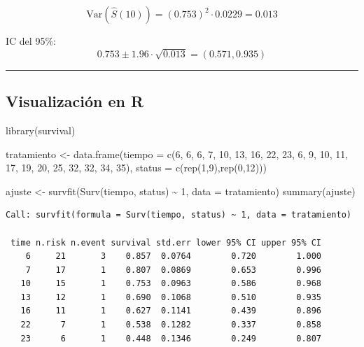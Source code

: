 \documentclass[
]{article}
\newenvironment{Shaded}{\begin{snugshade}}{\end{snugshade}}
\newcommand{\AttributeTok}[1]{\textcolor[rgb]{0.40,0.45,0.13}{#1}}
\newcommand{\DecValTok}[1]{\textcolor[rgb]{0.68,0.00,0.00}{#1}}
\newcommand{\FunctionTok}[1]{\textcolor[rgb]{0.28,0.35,0.67}{#1}}
\newcommand{\NormalTok}[1]{\textcolor[rgb]{0.00,0.23,0.31}{#1}}
\newcommand{\OtherTok}[1]{\textcolor[rgb]{0.00,0.23,0.31}{#1}}
\newcommand{\SpecialCharTok}[1]{\textcolor[rgb]{0.37,0.37,0.37}{#1}}
\begin{document}
\[
\text{Var}(\hat{S}(10)) = (0.753)^2 \cdot 0.0229 = 0.013
\]

IC del 95\%: \[
0.753 \pm 1.96 \cdot \sqrt{0.013} = (0.571, 0.935)
\]

\begin{center}\rule{0.5\linewidth}{0.5pt}\end{center}

\subsection{Visualización en R}\label{visualizaciuxf3n-en-r}

\begin{Shaded}
\begin{Highlighting}[]
\FunctionTok{library}\NormalTok{(survival)}

\NormalTok{tratamiento }\OtherTok{\textless{}{-}} \FunctionTok{data.frame}\NormalTok{(}\AttributeTok{tiempo =} \FunctionTok{c}\NormalTok{(}\DecValTok{6}\NormalTok{, }\DecValTok{6}\NormalTok{, }\DecValTok{6}\NormalTok{, }\DecValTok{7}\NormalTok{, }\DecValTok{10}\NormalTok{, }\DecValTok{13}\NormalTok{, }\DecValTok{16}\NormalTok{, }\DecValTok{22}\NormalTok{, }\DecValTok{23}\NormalTok{, }
                               \DecValTok{6}\NormalTok{, }\DecValTok{9}\NormalTok{, }\DecValTok{10}\NormalTok{, }\DecValTok{11}\NormalTok{, }\DecValTok{17}\NormalTok{, }\DecValTok{19}\NormalTok{, }\DecValTok{20}\NormalTok{, }\DecValTok{25}\NormalTok{, }\DecValTok{32}\NormalTok{, }\DecValTok{32}\NormalTok{, }\DecValTok{34}\NormalTok{, }\DecValTok{35}\NormalTok{),}
                    \AttributeTok{status =} \FunctionTok{c}\NormalTok{(}\FunctionTok{rep}\NormalTok{(}\DecValTok{1}\NormalTok{,}\DecValTok{9}\NormalTok{),}\FunctionTok{rep}\NormalTok{(}\DecValTok{0}\NormalTok{,}\DecValTok{12}\NormalTok{)))}

\NormalTok{ajuste }\OtherTok{\textless{}{-}} \FunctionTok{survfit}\NormalTok{(}\FunctionTok{Surv}\NormalTok{(tiempo, status) }\SpecialCharTok{\textasciitilde{}} \DecValTok{1}\NormalTok{, }\AttributeTok{data =}\NormalTok{ tratamiento)}
\FunctionTok{summary}\NormalTok{(ajuste)}
\end{Highlighting}
\end{Shaded}

\begin{verbatim}
Call: survfit(formula = Surv(tiempo, status) ~ 1, data = tratamiento)

 time n.risk n.event survival std.err lower 95% CI upper 95% CI
    6     21       3    0.857  0.0764        0.720        1.000
    7     17       1    0.807  0.0869        0.653        0.996
   10     15       1    0.753  0.0963        0.586        0.968
   13     12       1    0.690  0.1068        0.510        0.935
   16     11       1    0.627  0.1141        0.439        0.896
   22      7       1    0.538  0.1282        0.337        0.858
   23      6       1    0.448  0.1346        0.249        0.807
\end{verbatim}
\end{document}
